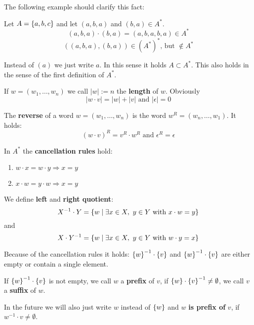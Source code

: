 The following example should clarify this fact: 

Let $A = \mbox{$\{a,b,c\}$}$ and let $(a,b,a)$ and $(b,a) \in A^*$.
\[(a,b,a)\cdot(b,a) = (a,b,a,b,a) \in A^* \]
\[((a,b,a),(b,a)) \in (A^*)^*\text{, but }\notin A^* \]

Instead of $(a)$ we just write $a$. In this sense it holds $A \subset A^*$. This
also holds in the sense of the first definition of $A^*$.

If $w = (w_1, \ldots, w_n)$ we call $|w| := n$ the {\bf length} of $w$.
Obviously \[|w \cdot v| = |w| + |v|\text{ and }|\epsilon| = 0\]


The {\bf reverse} of a word $w = (w_1,\ldots,w_n)$ is the word $w^R =
(w_n,\ldots,w_1)$. It holds:
\[ (w \cdot v)^R = v^R \cdot w^R \text{ and }\epsilon^R = \epsilon \]

In $A^*$ the {\bf cancellation rules} hold:
\begin{enumerate}
  \item $w \cdot x = w \cdot y \Rightarrow x = y$
  \item $x \cdot w = y \cdot w \Rightarrow x = y$
\end{enumerate}

We define {\bf left} and {\bf right quotient}:
\[ X^{-1} \cdot Y = \mbox{$\{w \mid \exists x \in X,\ y \in Y\text{ with }x \cdot w
= y \}$} \] 
and 
\[ X \cdot Y^{-1} = \mbox{$\{w \mid \exists x \in X,\ y \in Y\text{ with } w \cdot y
= x \}$} \]

Because of the cancellation rules it holds: $\mbox{$\{w\}$}^{-1} \cdot \mbox{$\{v\}$}$ and
$\mbox{$\{w\}$}^{-1} \cdot \mbox{$\{v\}$}$ are either empty or contain a single element.

If $\mbox{$\{w\}$}^{-1} \cdot \mbox{$\{v\}$}$ is not empty, we call $w$ a {\bf prefix} of $v$,
if $\mbox{$\{w\}$} \cdot \mbox{$\{v \}$}^{-1} \neq \emptyset$, we call $v$ a {\bf suffix}
of $w$.

In the future we will also just write $w$ instead of $\mbox{$\{w\}$}$ and $w$ {\bf is
prefix of} $v$, if $w^{-1} \cdot v \neq \emptyset$.
